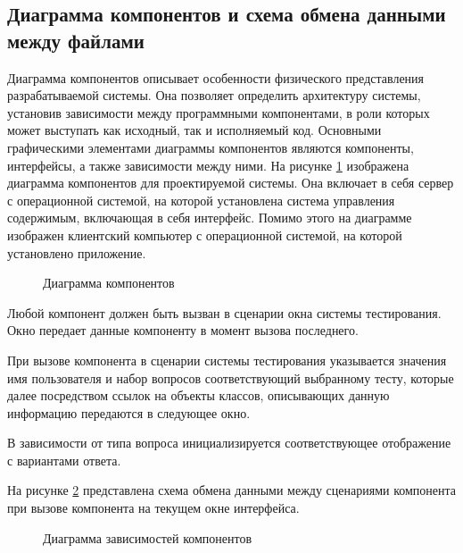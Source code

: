 \subsection{Диаграмма компонентов и схема обмена данными между файлами}

Диаграмма компонентов описывает особенности физического представления разрабатываемой системы. Она позволяет определить архитектуру системы, установив зависимости между программными компонентами, в роли которых может выступать как исходный, так и исполняемый код. Основными графическими элементами диаграммы компонентов являются компоненты, интерфейсы, а также зависимости между ними. На рисунке \ref{system_template:image} изображена диаграмма компонентов для проектируемой системы. Она включает в себя сервер с операционной системой, на которой установлена система управления содержимым, включающая в себя интерфейс. Помимо этого на диаграмме изображен клиентский компьютер с операционной системой, на которой установлено приложение.

\newpage

\begin{landscape}
	\begin{figure}[ht]
		\caption{Диаграмма компонентов}
		\label{system_template:image}
	\end{figure}
\end{landscape}

Любой компонент должен быть вызван в сценарии окна системы тестирования. Окно передает данные компоненту в момент вызова последнего.

При вызове компонента в сценарии системы тестирования указывается значения имя пользователя и набор вопросов соответствующий выбранному тесту, которые далее посредством ссылок на объекты классов, описывающих данную информацию передаются в следующее окно.

В зависимости от типа вопроса инициализируется соответствующее отображение с вариантами ответа.

На рисунке \ref{exchange_scheme:image} представлена схема обмена данными между сценариями компонента при вызове компонента на текущем окне интерфейса.

\newpage
\begin{figure}[H]
	\caption{Диаграмма зависимостей компонентов}
	\label{exchange_scheme:image}
\end{figure}

